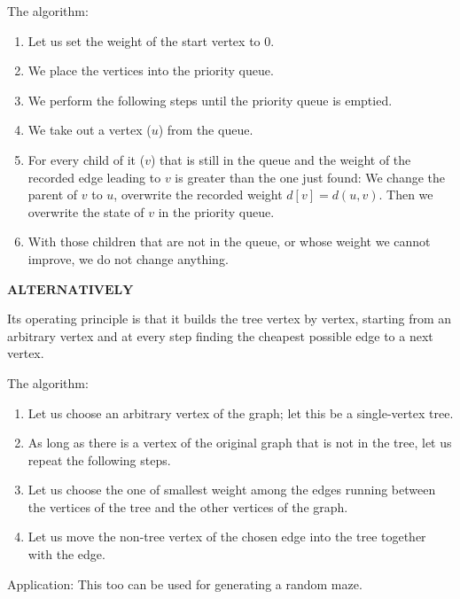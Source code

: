 \documentclass[margin=0px]{article}
\begin{document}
\begin{description}
	The algorithm:
	\begin{enumerate}
	    \item Let us set the weight of the start vertex to 0.
	    \item We place the vertices into the priority queue.
	    \item We perform the following steps until the priority queue is emptied.
	    \item We take out a vertex ($u$) from the queue.
	    \item For every child of it ($v$) that is still in the queue and the weight of the recorded edge leading to $v$ is greater than the one just found: We change the parent of $v$ to $u$, overwrite the recorded weight $d[v] = d(u,v)$. Then we overwrite the state of $v$ in the priority queue.
	    \item With those children that are not in the queue, or whose weight we cannot improve, we do not change anything.
	\end{enumerate}

$\textbf{ALTERNATIVELY}$

Its operating principle is that it builds the tree vertex by vertex, starting from an arbitrary vertex and at every step finding the cheapest possible edge to a next vertex.

	  The algorithm:
	  \begin{enumerate}
		\item Let us choose an arbitrary vertex of the graph; let this be a single-vertex tree.
		\item As long as there is a vertex of the original graph that is not in the tree, let us repeat the following steps.
		\item Let us choose the one of smallest weight among the edges running between the vertices of the tree and the other vertices of the graph.
		\item Let us move the non-tree vertex of the chosen edge into the tree together with the edge.
	  \end{enumerate}
	  Application: This too can be used for generating a random maze.
\end{description}
\end{document}
